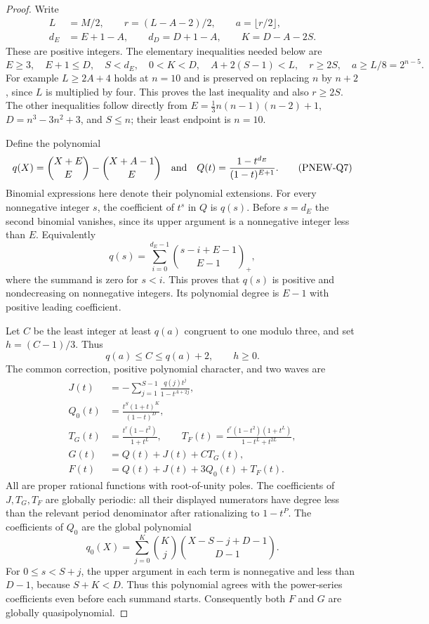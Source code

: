 \begin{proof}
Write
\[
 \begin{aligned}
 L&=M/2,\qquad r=(L-A-2)/2,\qquad a=\lfloor r/2\rfloor,\\
 d_E&=E+1-A,\qquad d_D=D+1-A,\qquad K=D-A-2S.
 \end{aligned}
 \tag{PNEW-Q5}
\]
These are positive integers. The elementary inequalities needed below are
\[
 E\ge3,\quad E+1\le D,\quad S<d_E,\quad
 0<K<D,\quad A+2(S-1)<L,\quad r\ge2S,
 \quad a\ge L/8=2^{n-5}.
 \tag{PNEW-Q6}
\]
For example $L\ge2A+4$ holds at $n=10$ and is preserved on replacing
$n$ by $n+2$, since $L$ is multiplied by four. This proves the last
inequality and also $r\ge2S$. The other inequalities follow directly
from $E=\frac13n(n-1)(n-2)+1$, $D=n^3-3n^2+3$, and $S\le n$;
their least endpoint is $n=10$.

Define the polynomial
\[
 q(X)=\binom{X+E}{E}-\binom{X+A-1}{E}
 \quad\hbox{and}\quad
 Q(t)=\frac{1-t^{d_E}}{(1-t)^{E+1}}.
 \tag{PNEW-Q7}
\]
Binomial expressions here denote their polynomial extensions.
For every nonnegative integer $s$, the coefficient of $t^s$ in $Q$
is $q(s)$. Before $s=d_E$ the second binomial vanishes, since its
upper argument is a nonnegative integer less than $E$.
Equivalently
\[
 q(s)=\sum_{i=0}^{d_E-1}\binom{s-i+E-1}{E-1}_{+},
 \tag{PNEW-Q8}
\]
where the summand is zero for $s<i$. This proves that $q(s)$ is
positive and nondecreasing on nonnegative integers. Its polynomial
degree is $E-1$ with positive leading coefficient.

Let $C$ be the least integer at least $q(a)$ congruent to one modulo
three, and set $h=(C-1)/3$. Thus
\[
                  q(a)\le C\le q(a)+2,\qquad h\ge0.
 \tag{PNEW-Q9}
\]
The common correction, positive polynomial character, and two waves are
\[
\begin{split}
 J(t)&=-\sum_{j=1}^{S-1}\frac{q(j)t^j}{1-t^{A+2j}},\\
 Q_0(t)&=\frac{t^S(1+t)^K}{(1-t)^D},\\
 T_G(t)&=\frac{t^r(1-t^2)}{1+t^L},\qquad
 T_F(t)=\frac{t^r(1-t^2)(1+t^L)}{1-t^L+t^{2L}},\\
 G(t)&=Q(t)+J(t)+C T_G(t),\\
 F(t)&=Q(t)+J(t)+3Q_0(t)+T_F(t).
\end{split}
 \tag{PNEW-Q10}
\]
All are proper rational functions with root-of-unity poles. The coefficients
of $J,T_G,T_F$ are globally periodic: all their displayed numerators
have degree less than the relevant period denominator after rationalizing
to $1-t^P$. The coefficients of $Q_0$ are the global polynomial
\[
 q_0(X)=\sum_{j=0}^K\binom Kj
                \binom{X-S-j+D-1}{D-1}.
 \tag{PNEW-Q11}
\]
For $0\le s<S+j$, the upper argument in each term is nonnegative
and less than $D-1$, because $S+K<D$. Thus this polynomial agrees
with the power-series coefficients even before each summand starts.
Consequently both $F$ and $G$ are globally quasipolynomial.


\end{proof}

